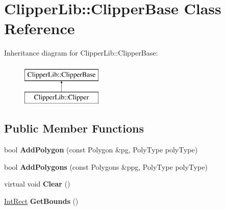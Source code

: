 \hypertarget{classClipperLib_1_1ClipperBase}{\section{Clipper\-Lib\-:\-:Clipper\-Base Class Reference}
\label{classClipperLib_1_1ClipperBase}
}
Inheritance diagram for Clipper\-Lib\-:\-:Clipper\-Base\-:\begin{figure}[H]
\begin{center}
\leavevmode
\includegraphics[height=2.000000cm]{classClipperLib_1_1ClipperBase}
\end{center}
\end{figure}
\subsection*{Public Member Functions}
\begin{DoxyCompactItemize}
\item 
\hypertarget{classClipperLib_1_1ClipperBase_a62f7b073052eed2d0ee9af69a237badd}{bool {\bfseries Add\-Polygon} (const Polygon \&pg, Poly\-Type poly\-Type)}\label{classClipperLib_1_1ClipperBase_a62f7b073052eed2d0ee9af69a237badd}

\item 
\hypertarget{classClipperLib_1_1ClipperBase_a5cdf386f8ba72b196dec6ad0a8607bbf}{bool {\bfseries Add\-Polygons} (const Polygons \&ppg, Poly\-Type poly\-Type)}\label{classClipperLib_1_1ClipperBase_a5cdf386f8ba72b196dec6ad0a8607bbf}

\item 
\hypertarget{classClipperLib_1_1ClipperBase_a5690952fe8c2cb047025566405827821}{virtual void {\bfseries Clear} ()}\label{classClipperLib_1_1ClipperBase_a5690952fe8c2cb047025566405827821}

\item 
\hypertarget{classClipperLib_1_1ClipperBase_a5590a5454248ac3f6beeba7f9690f62e}{\hyperlink{structClipperLib_1_1IntRect}{Int\-Rect} {\bfseries Get\-Bounds} ()}\label{classClipperLib_1_1ClipperBase_a5590a5454248ac3f6beeba7f9690f62e}

\end{DoxyCompactItemize}
